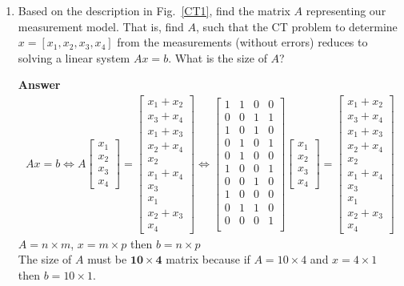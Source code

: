 \documentclass[10pt,a4paper]{article}
\theoremstyle{plain}
\theoremstyle{definition}
\begin{document}
\begin{enumerate}
  \item Based on the description in Fig.~\ref{CT1}, find the matrix
  \(A\) representing our measurement model.
  That is, find \(A\), such that the CT problem to determine \(x=[x_1,x_2,x_3,x_4]\) from the measurements (without errors) reduces to solving a linear system \(Ax=b\).
  What is the size of \(A\)?
  \item[\textbf{Answer}] 
  \begin{align*}
    Ax=b \Longleftrightarrow A\begin{bmatrix}x_1 \\ x_2 \\ x_3 \\x_4 \end{bmatrix}=\begin{bmatrix}
    x_1+x_2 \\ x_3+x_4 \\ x_1 + x_3 \\ x_2 + x_4 \\ x_2 \\ x_1 + x_4 \\ x_3 \\ x_1 \\ x_2 + x_3 \\ x_4
    \end{bmatrix}
      \Longleftrightarrow 
    \begin{bmatrix}
    1 & 1 & 0 & 0 \\
    0 & 0 & 1 & 1 \\
    1 & 0 & 1 & 0 \\
    0 & 1 & 0 & 1 \\
    0 & 1 & 0 & 0 \\
    1 & 0 & 0 & 1 \\
    0 & 0 & 1 & 0 \\
    1 & 0 & 0 & 0 \\
    0 & 1 & 1 & 0 \\
    0 & 0 & 0 & 1 \\
    \end{bmatrix}
    \begin{bmatrix}x_1 \\ x_2 \\ x_3 \\x_4 \end{bmatrix}=\begin{bmatrix}
    x_1+x_2 \\ x_3+x_4 \\ x_1 + x_3 \\ x_2 + x_4 \\ x_2 \\ x_1 + x_4 \\ x_3 \\ x_1 \\ x_2 + x_3 \\ x_4
    \end{bmatrix}
  \end{align*}
  $A=n \times m$, $x=m \times p$ then $b=n \times p$ \\
  The size of $A$ must be $\mathbf{10 \times 4}$ matrix because if $A=10 \times 4$ and $x=4 \times 1$ then $b=10 \times 1$.


\end{enumerate}
\end{document}
